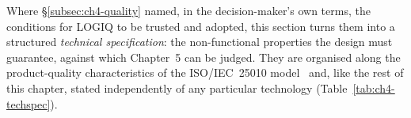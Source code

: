 Where \S\ref{subsec:ch4-quality} named, in the decision-maker's own terms, the conditions for LOGIQ to
be trusted and adopted, this section turns them into a structured \emph{technical specification}: the
non-functional properties the design must guarantee, against which Chapter~5 can be judged. They are
organised along the product-quality characteristics of the ISO/IEC~25010 model~\parencite{iso25010}
and, like the rest of this chapter, stated independently of any particular technology
(Table~\ref{tab:ch4-techspec}).

\begingroup
\renewcommand{\arraystretch}{1.35}
